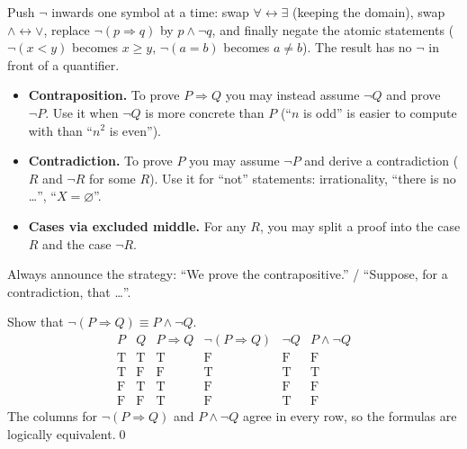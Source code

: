 \begin{strategy}
Push $\neg$ inwards one symbol at a time: swap $\forall\leftrightarrow\exists$ (keeping the domain), swap $\wedge\leftrightarrow\vee$, replace $\neg(p\Rightarrow q)$ by $p\wedge\neg q$, and finally negate the atomic statements ($\neg(x<y)$ becomes $x\ge y$, $\neg(a=b)$ becomes $a\ne b$). The result has no $\neg$ in front of a quantifier.
\end{strategy}

\begin{strategy}
\begin{itemize}
\item \textbf{Contraposition.} To prove $P\Rightarrow Q$ you may instead assume $\neg Q$ and prove $\neg P$. Use it when $\neg Q$ is more concrete than $P$ (``$n$ is odd'' is easier to compute with than ``$n^2$ is even'').
\item \textbf{Contradiction.} To prove $P$ you may assume $\neg P$ and derive a contradiction ($R$ and $\neg R$ for some $R$). Use it for ``not'' statements: irrationality, ``there is no \dots'', ``$X=\varnothing$''.
\item \textbf{Cases via excluded middle.} For any $R$, you may split a proof into the case $R$ and the case $\neg R$.
\end{itemize}
Always announce the strategy: ``We prove the contrapositive.'' / ``Suppose, for a contradiction, that \dots''.
\end{strategy}

\begin{hexample}\label{ex:tt}
Show that $\neg(P\Rightarrow Q)\equiv P\wedge\neg Q$.
\solution
\[
\begin{array}{cc|cc|cc}
P&Q&P\Rightarrow Q&\neg(P\Rightarrow Q)&\neg Q&P\wedge\neg Q\\\hline
\mathrm T&\mathrm T&\mathrm T&\mathrm F&\mathrm F&\mathrm F\\
\mathrm T&\mathrm F&\mathrm F&\mathrm T&\mathrm T&\mathrm T\\
\mathrm F&\mathrm T&\mathrm T&\mathrm F&\mathrm F&\mathrm F\\
\mathrm F&\mathrm F&\mathrm T&\mathrm F&\mathrm T&\mathrm F
\end{array}
\]
The columns for $\neg(P\Rightarrow Q)$ and $P\wedge\neg Q$ agree in every row, so the formulas are logically equivalent.\qed
\end{hexample}

